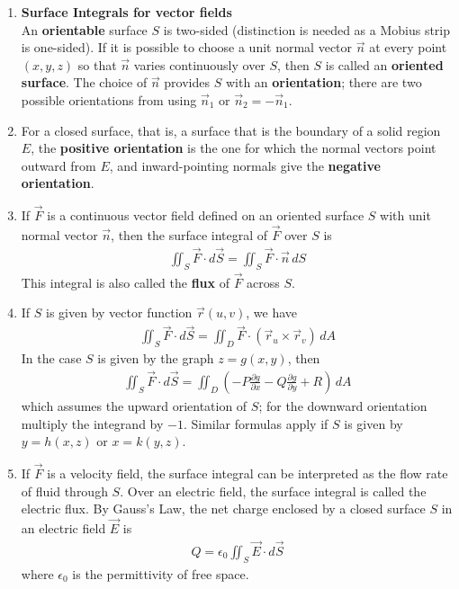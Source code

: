 \documentclass[10pt]{article}
\begin{document}
\begin{multicols}{2}
\begin{enumerate}
\begin{enumerate}
        \item \textbf{Surface Integrals for vector fields} \\
        An \textbf{orientable} surface $S$ is two-sided (distinction is needed as a Mobius strip is one-sided). If it is possible to choose a unit normal vector $\vec{n}$ at every point $(x,y,z)$ so that $\vec{n}$ varies continuously over $S$, then $S$ is called an \textbf{oriented surface}. The choice of $\vec{n}$ provides $S$ with an \textbf{orientation}; there are two possible orientations from using $\vec{n}_1$ or $\vec{n}_2 = - \vec{n}_1$. 
        \item For a closed surface, that is, a surface that is the boundary of a solid region $E$, the \textbf{positive orientation} is the one for which the normal vectors point outward from $E$, and inward-pointing normals give the \textbf{negative orientation}.
        \item If $\vec{F}$ is a continuous vector field defined on an oriented surface $S$ with unit normal vector $\vec{n}$, then the surface integral of $\vec{F}$ over $S$ is
        \begin{align*}
            \iint_S \vec{F} \cdot d\vec{S} = \iint_S \vec{F} \cdot \vec{n} \,dS
        \end{align*}
        This integral is also called the \textbf{flux} of $\vec{F}$ across $S$.
        \item If $S$ is given by vector function $\vec{r}(u,v)$, we have
        \begin{align*}
            \iint_S \vec{F} \cdot d\vec{S} = \iint_D \vec{F} \cdot (\vec{r}_u \times \vec{r}_v) \,dA
        \end{align*}
        In the case $S$ is given by the graph $z=g(x,y)$, then
        \begin{align*}
            \iint_S \vec{F} \cdot d\vec{S} = \iint_D \left( -P\frac{\partial g}{\partial x} - Q \frac{\partial g}{\partial y} + R \right) \,dA
        \end{align*}
        which assumes the upward orientation of $S$; for the downward orientation multiply the integrand by $-1$. Similar formulas apply if $S$ is given by $y=h(x,z)$ or $x=k(y,z)$.
        \item If $\vec{F}$ is a velocity field, the surface integral can be interpreted as the flow rate of fluid through $S$. Over an electric field, the surface integral is called the electric flux. By Gauss's Law, the net charge enclosed by a closed surface $S$ in an electric field $\vec{E}$ is
        \begin{align*}
            Q = \epsilon_0 \iint_S \vec{E} \cdot d\vec{S}
        \end{align*}
        where $\epsilon_0$ is the permittivity of free space.
    \end{enumerate}
    

\end{enumerate}
\end{multicols}
\end{document}
